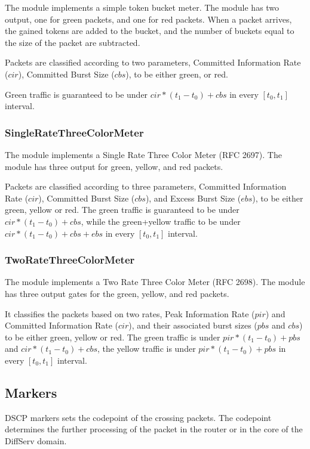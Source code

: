 The  module implements a simple token bucket meter.
The module has two output, one for green packets, and one for red packets.
When a packet arrives, the gained tokens are added to the bucket, and
the number of buckets equal to the size of the packet are subtracted.

Packets are classified according to two parameters,
Committed Information Rate ($cir$), Committed Burst Size ($cbs$),
to be either green, or red.

Green traffic is guaranteed to be under $cir*(t_1-t_0)+cbs$ in
every $[t_0,t_1]$ interval.

\subsubsection*{SingleRateThreeColorMeter}

The  module implements a
Single Rate Three Color Meter (RFC 2697).
The module has three output for green, yellow, and red packets.

Packets are classified according to three parameters,
Committed Information Rate ($cir$), Committed Burst Size ($cbs$),
and Excess Burst Size ($ebs$), to be either green, yellow or red.
The green traffic is guaranteed to be under $cir*(t_1-t_0)+cbs$,
while the green+yellow traffic to be under $cir*(t_1-t_0)+cbs+ebs$
in every $[t_0,t_1]$ interval.


\subsubsection*{TwoRateThreeColorMeter}

The  module implements a
Two Rate Three Color Meter (RFC 2698). The module has three output
gates for the green, yellow, and red packets.

It classifies the packets based on two rates, Peak Information Rate ($pir$)
and Committed Information Rate ($cir$), and their associated burst sizes
($pbs$ and $cbs$) to be either green, yellow or red. The green traffic
is under $pir*(t_1-t_0)+pbs$ and $cir*(t_1-t_0)+cbs$, the yellow traffic
is under $pir*(t_1-t_0)+pbs$ in every $[t_0,t_1]$ interval.

\subsection{Markers}

DSCP markers sets the codepoint of the crossing packets.
The codepoint determines the further processing of the packet
in the router or in the core of the DiffServ domain.

